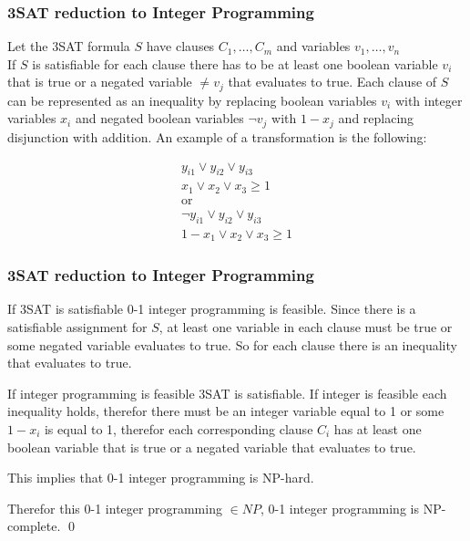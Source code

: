 \documentclass[mathserif]{beamer}
\begin{document}
\begin{frame}
\frametitle{3SAT reduction to Integer Programming}

Let the 3SAT formula $S$ have clauses $C_1,\ldots,C_m$ and variables
$v_1,\ldots,v_n$\\

If $S$ is satisfiable for each clause there has to be at least one boolean
variable $v_i$ that is true or a negated variable $\neq v_j$ that evaluates to
true. Each clause of $S$ can be represented as an inequality by replacing
boolean variables $v_i$ with integer variables $x_i$ and negated boolean
variables $\neg v_j$ with $1 - x_j$ and replacing disjunction with addition. An
example of a transformation is the following:

\begin{align*}
	y_{i1} \vee y_{i2} \vee y_{i3}\\
	x_{1} \vee x_{2} \vee x_{3} \geq 1\\
	\text{or}\\
	\neg y_{i1} \vee y_{i2} \vee y_{i3}\\
	1 - x_{1} \vee x_{2} \vee x_{3} \geq 1
\end{align*}

\end{frame}

\begin{frame}
\frametitle{3SAT reduction to Integer Programming}

If 3SAT is satisfiable 0-1 integer programming is feasible. Since there is a satisfiable assignment for $S$, at least one variable in each
clause must be true or some negated variable evaluates to true. So for each
clause there is an inequality that evaluates to true.

If integer programming is feasible 3SAT is satisfiable. If integer is feasible
each inequality holds, therefor there must be an integer variable equal to 1 or
some $1 - x_i$ is equal to 1, therefor each corresponding clause $C_i$ has at
least one boolean variable that is true or a negated variable that evaluates to
true.

This implies that 0-1 integer programming is NP-hard.

Therefor this 0-1 integer programming $\in \mathit{NP}$, 0-1 integer
programming is NP-complete. \qed

\end{frame}
\end{document}
